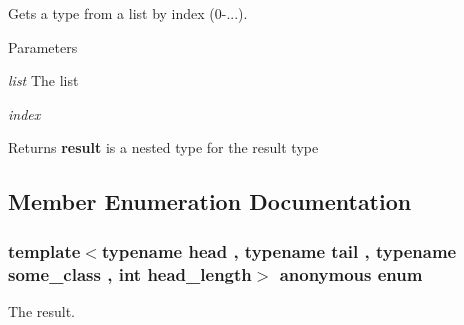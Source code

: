 Gets a type from a list by index (0-\/...). 
\begin{DoxyParams}{Parameters}
\item[{\em list}]The list \item[{\em index}]\end{DoxyParams}
\begin{DoxyReturn}{Returns}
{\bfseries result} is a nested type for the result type 
\end{DoxyReturn}


\subsection{Member Enumeration Documentation}
\hypertarget{structavrpp_1_1typelist_1_1get__index_3_01typelist_3_01head_00_01tail_01_4_00_01some__class_00_01head__length_01_4_a6223a4c1f847b070f8660a14e7ba6cb2}{
\subsubsection[{"@30}]{\setlength{\rightskip}{0pt plus 5cm}template$<$typename head , typename tail , typename some\_\-class , int head\_\-length$>$ anonymous enum}}
\label{structavrpp_1_1typelist_1_1get__index_3_01typelist_3_01head_00_01tail_01_4_00_01some__class_00_01head__length_01_4_a6223a4c1f847b070f8660a14e7ba6cb2}


The result. 

